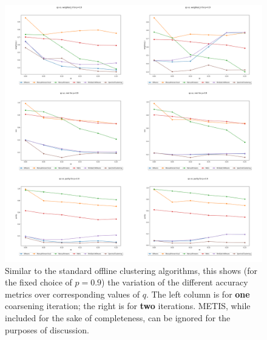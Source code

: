 \documentclass{article}
\begin{document}
\begin{figure}[H]
    \centering
    \includegraphics[width=1.0\textwidth]{results/results_coarsen.png}
    \caption[Coarsened accuracies across $p$]{Similar to the standard offline clustering algorithms, this shows (for the fixed choice of $p=0.9$) the variation of the different accuracy metrics over corresponding values of $q$. The left column is for \textbf{one} coarsening iteration; the right is for \textbf{two} iterations. METIS, while included for the sake of completeness, can be ignored for the purposes of discussion.}
    \label{fig:results_coarsen}
\end{figure}
\end{document}
